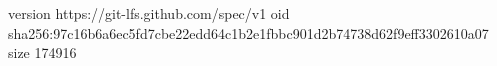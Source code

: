 version https://git-lfs.github.com/spec/v1
oid sha256:97c16b6a6ec5fd7cbe22edd64c1b2e1fbbc901d2b74738d62f9eff3302610a07
size 174916
